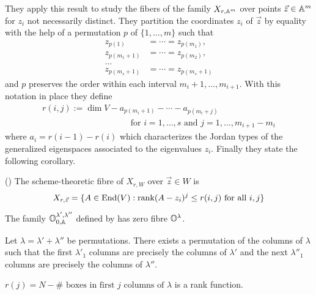 \documentclass[draft]{article}
\begin{document}
They apply this result to study the fibers of the family $X_{r,\AA^m}$ over points $\vec z \in \AA^m$ for $z_i$ not necessarily distinct. They partition the coordinates $z_i$ of $\vec z$ by equality with the help of a permutation $p$ of $\{1,\dots,m\}$ such that 
\begin{align*}
    z_{p(1)} &= \cdots = z_{p(m_1)} , \\
    z_{p(m_1 + 1)} &= \cdots = z_{p(m_2)} , \\ 
    \dots \\
    z_{p(m_s + 1)} &= \cdots = z_{p(m_s + 1)}
\end{align*}
and $p$ preserves the order within each interval $m_i + 1,\dots,m_{i+1}$.  With this notation in place they define 
\begin{gather*}
    r(i,j):= \dim V - a_{p(m_i + 1)} - \cdots - a_{p(m_i + j )} \\
    \qquad \qquad \qquad \qquad \qquad \text{ for } i = 1,\dots,s \text{ and } j = 1,\dots , m_{i + 1 } - m_i 
\end{gather*}
where $a_i = r(i-1) - r(i)$ which characterizes the Jordan types of the generalized eigenspaces associated to the eigenvalues $z_i$. Finally they state the following corollary. 
\begin{corollary}
    (\cite[Corollary~2.2]{eisenbud1989rank})
    The scheme-theoretic fibre of $X_{r,W}$ over $\vec z\in W$ is 
    \[
        X_{r,\vec z} = \{A \in \End(V) : \rk (A-z_i)^j\le r(i,j) \text{ for all } i , j \}
    \]
\end{corollary}

\begin{corollary}
    \label{cor:es}
    The family $\OO^{\lambda',\lambda''}_{0,\AA}$ defined by  has zero fibre $\OO^\lambda$. 
\end{corollary}

\begin{lemma}
    \label{lem:es}
    Let $\lambda = \lambda' + \lambda''$ be permutations. There exists a permutation of the columns of $\lambda$ such that the first $\lambda'_1$ columns are precisely the columns of $\lambda'$ and the next $\lambda''_1$ columns are precisely the columns of $\lambda''$. 
\end{lemma}

\begin{lemma}
   $r(j) = N - \#\text{~boxes in first $j$ columns of }\lambda$ is a rank function. 
\end{lemma}
\end{document}
